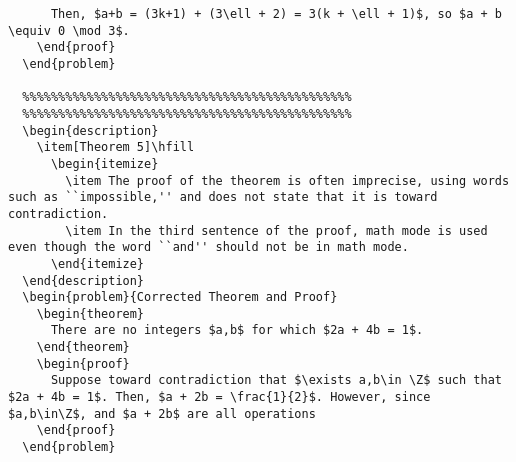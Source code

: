 \documentclass[9pt]{extarticle}
\newtheorem{theorem}{Theorem}
\newcommand{\Z}{\mathbb{Z}}
\begin{document}
\begin{lstlisting}
      Then, $a+b = (3k+1) + (3\ell + 2) = 3(k + \ell + 1)$, so $a + b \equiv 0 \mod 3$.
    \end{proof}
  \end{problem}

  %%%%%%%%%%%%%%%%%%%%%%%%%%%%%%%%%%%%%%%%%%%%%%
  %%%%%%%%%%%%%%%%%%%%%%%%%%%%%%%%%%%%%%%%%%%%%%
  \begin{description}
    \item[Theorem 5]\hfill
      \begin{itemize}
        \item The proof of the theorem is often imprecise, using words such as ``impossible,'' and does not state that it is toward contradiction.
        \item In the third sentence of the proof, math mode is used even though the word ``and'' should not be in math mode.
      \end{itemize}
  \end{description}
  \begin{problem}{Corrected Theorem and Proof}
    \begin{theorem}
      There are no integers $a,b$ for which $2a + 4b = 1$.
    \end{theorem}
    \begin{proof}
      Suppose toward contradiction that $\exists a,b\in \Z$ such that $2a + 4b = 1$. Then, $a + 2b = \frac{1}{2}$. However, since $a,b\in\Z$, and $a + 2b$ are all operations 
    \end{proof}
  \end{problem}


\end{lstlisting}
\end{document}

